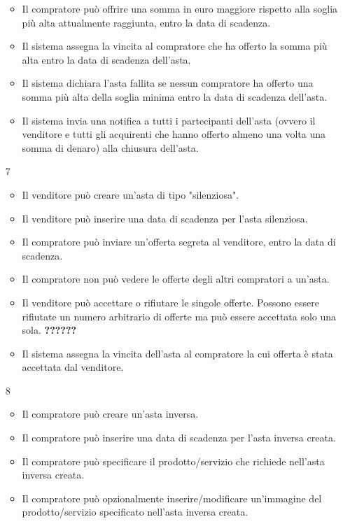 \begin{itemize}
\begin{itemize}
                \item Il compratore può offrire una somma in euro maggiore rispetto alla soglia più alta attualmente raggiunta, entro la data di scadenza.
                \item Il sistema assegna la vincita al compratore che ha offerto la somma più alta entro la data di scadenza dell'asta.
                \item Il sistema dichiara l'asta fallita se nessun compratore ha offerto una somma più alta della soglia minima entro la data di scadenza dell'asta.
                \item Il sistema invia una notifica a tutti i partecipanti dell'asta (ovvero il venditore e tutti gli acquirenti che hanno offerto almeno una volta una somma di denaro) alla chiusura dell'asta.
            \end{itemize} %
            \item[7] 
            \begin{itemize} %
                \item Il venditore può creare un'asta di tipo "silenziosa".
                \item Il venditore può inserire una data di scadenza per l'asta silenziosa.
                \item Il compratore può inviare un'offerta segreta al venditore, entro la data di scadenza.
                \item Il compratore non può vedere le offerte degli altri compratori a un'asta.
                \item Il venditore può accettare o rifiutare le singole offerte. Possono essere rifiutate un numero arbitrario di offerte ma può essere accettata solo una sola. \textbf{??????}
                \item Il sistema assegna la vincita dell'asta al compratore la cui offerta è stata accettata dal venditore.
            \end{itemize} %
            \item[8]
            \begin{itemize}            
                \item Il compratore può creare un'asta inversa.
                \item Il compratore può inserire una data di scadenza per l'asta inversa creata.
                \item Il compratore può specificare il prodotto/servizio che richiede nell'asta inversa creata.
                \item Il compratore può opzionalmente inserire/modificare un'immagine del prodotto/servizio specificato nell'asta inversa creata.

\end{itemize}
\end{itemize}
